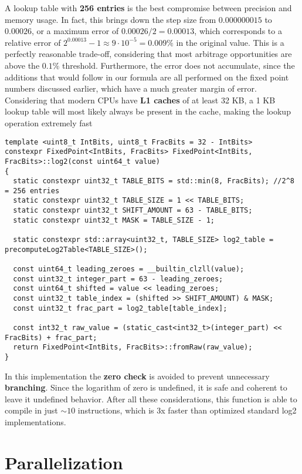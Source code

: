 \documentclass[11pt]{article}
\begin{document}
A lookup table with \textbf{256 entries} is the best compromise between precision and memory usage. In fact, this brings down the step size from $0.000000015$ to $0.00026$, or a maximum error of $0.00026 / 2 = 0.00013$, which corresponds to a relative error of $2^{0.00013} - 1 \approx 9 \cdot 10^{-5} = 0.009\%$ in the original value. This is a perfectly reasonable trade-off, considering that most arbitrage opportunities are above the $0.1\%$ threshold. Furthermore, the error does not accumulate, since the additions that would follow in our formula are all performed on the fixed point numbers discussed earlier, which have a much greater margin of error. Considering that modern CPUs have \textbf{L1 caches} of at least 32 KB, a 1 KB lookup table will most likely always be present in the cache, making the lookup operation extremely fast

\newpage
\begin{verbatim}
template <uint8_t IntBits, uint8_t FracBits = 32 - IntBits>
constexpr FixedPoint<IntBits, FracBits> FixedPoint<IntBits, FracBits>::log2(const uint64_t value)
{
  static constexpr uint32_t TABLE_BITS = std::min(8, FracBits); //2^8 = 256 entries
  static constexpr uint32_t TABLE_SIZE = 1 << TABLE_BITS;
  static constexpr uint32_t SHIFT_AMOUNT = 63 - TABLE_BITS;
  static constexpr uint32_t MASK = TABLE_SIZE - 1;

  static constexpr std::array<uint32_t, TABLE_SIZE> log2_table = precomputeLog2Table<TABLE_SIZE>();

  const uint64_t leading_zeroes = __builtin_clzll(value);
  const uint32_t integer_part = 63 - leading_zeroes;
  const uint64_t shifted = value << leading_zeroes;
  const uint32_t table_index = (shifted >> SHIFT_AMOUNT) & MASK;
  const uint32_t frac_part = log2_table[table_index];

  const int32_t raw_value = (static_cast<int32_t>(integer_part) << FracBits) + frac_part;
  return FixedPoint<IntBits, FracBits>::fromRaw(raw_value);
}
\end{verbatim}
In this implementation the \textbf{zero check} is avoided to prevent unnecessary \textbf{branching}. Since the logarithm of zero is undefined, it is safe and coherent to leave it undefined behavior. After all these considerations, this function is able to compile in just $\sim{10}$ instructions, which is 3x faster than optimized standard log2 implementations\textsuperscript{\cite{libc_log2}}.

\section{Parallelization}
\end{document}
